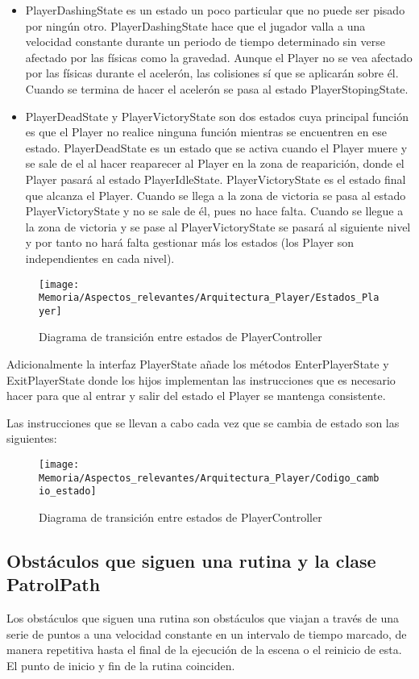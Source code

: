 \begin{itemize}
\item
PlayerDashingState es un estado un poco particular que no puede ser pisado por ningún otro. PlayerDashingState hace que el jugador valla a una velocidad constante durante un periodo de tiempo determinado sin verse afectado por las físicas como la gravedad. Aunque el Player no se vea afectado por las físicas durante el acelerón, las colisiones sí que se aplicarán sobre él. Cuando se termina de hacer el acelerón se pasa al estado PlayerStopingState.
\item
PlayerDeadState y PlayerVictoryState son dos estados cuya principal función es que el Player no realice ninguna función mientras se encuentren en ese estado. PlayerDeadState es un estado que se activa cuando el Player muere y se sale de el al hacer reaparecer al Player en la zona de reaparición, donde el Player pasará al estado PlayerIdleState. PlayerVictoryState es el estado final que alcanza el Player. Cuando se llega a la zona de victoria se pasa al estado PlayerVictoryState y no se sale de él, pues no hace falta. Cuando se llegue a la zona de victoria y se pase al PlayerVictoryState se pasará al siguiente nivel y por tanto no hará falta gestionar más los estados (los Player son independientes en cada nivel).
\end{itemize}

\begin{figure}[h]
\centering
\texttt{[image: Memoria/Aspectos\_relevantes/Arquitectura\_Player/Estados\_Player]}
\caption{Diagrama de transición entre estados de PlayerController}
\end{figure}

Adicionalmente la interfaz PlayerState añade los métodos EnterPlayerState y ExitPlayerState donde los hijos implementan las instrucciones que es necesario hacer para que al entrar y salir del estado el Player se mantenga consistente.

\clearpage
Las instrucciones que se llevan a cabo cada vez que se cambia de estado son las siguientes:
\begin{figure}[h]
\centering
\texttt{[image: Memoria/Aspectos\_relevantes/Arquitectura\_Player/Codigo\_cambio\_estado]}
\caption{Diagrama de transición entre estados de PlayerController}
\end{figure}

\subsection{Obstáculos que siguen una rutina y la clase PatrolPath}
Los obstáculos que siguen una rutina son obstáculos que viajan a través de una serie de puntos a una velocidad constante en un intervalo de tiempo marcado, de manera repetitiva hasta el final de la ejecución de la escena o el reinicio de esta. El punto de inicio y fin de la rutina coinciden. 


